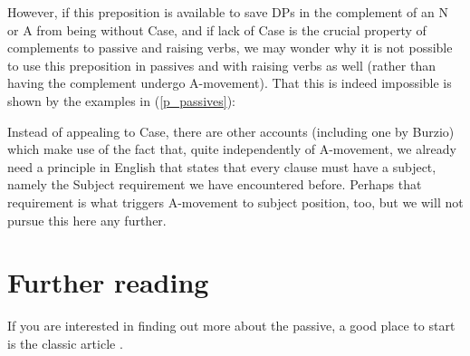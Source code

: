\documentclass{article}
\begin{document}
However, if this preposition is available to save DPs in the complement of an N or A from being without Case, and if lack of Case is the crucial property of complements to passive and raising verbs, we may wonder why it is not possible to use this preposition in passives and with raising verbs as well (rather than having the complement undergo A-movement).
That this is indeed impossible is shown by the examples in (\ref{p_passives}):
\begin{exe}
    \label{p_passives}
\end{exe}
Instead of appealing to Case, there are other accounts (including one by Burzio) which make use of the fact that, quite independently of A-movement, we already need a principle in English that states that every clause must have a subject, namely the Subject requirement we have encountered before.
Perhaps that requirement is what triggers A-movement to subject position, too, but we will not pursue this here any further.

\section*{Further reading}

If you are interested in finding out more about the passive, a good place to start is the classic article \citet{jaeggli_passive_1986}.

\printbibliography
\end{document}
